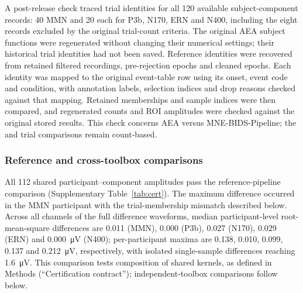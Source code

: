 A post-release check traced trial identities for all 120 available subject-component records: 40 MMN and 20 each for P3b, N170, ERN and N400, including the eight records excluded by the original trial-count criteria. The original AEA subject functions were regenerated without changing their numerical settings; their historical trial identities had not been saved. Reference identities were recovered from retained filtered recordings, pre-rejection epochs and cleaned epochs. Each identity was mapped to the original event-table row using its onset, event code and condition, with annotation labels, selection indices and drop reasons checked against that mapping. Retained memberships and sample indices were then compared, and regenerated counts and ROI amplitudes were checked against the original stored results. This check concerns AEA versus MNE-BIDS-Pipeline; the \eeglab{} and \fieldtrip{} trial comparisons remain count-based.

\subsubsection*{Reference and cross-toolbox comparisons}

All 112 shared participant--component amplitudes pass the reference-pipeline comparison (Supplementary Table~\ref*{tab:cert}). The maximum difference occurred in the MMN participant with the trial-membership mismatch described below. Across all channels of the full difference waveforms, median participant-level root-mean-square differences are 0.011 (MMN), 0.000 (P3b), 0.027 (N170), 0.029 (ERN) and \SI{0.000}{\uV} (N400); per-participant maxima are 0.138, 0.010, 0.099, 0.137 and \SI{0.212}{\uV}, respectively, with isolated single-sample differences reaching \SI{1.6}{\uV}. This comparison tests composition of shared \mne{} kernels, as defined in Methods (``Certification contract''); independent-toolbox comparisons follow below.

